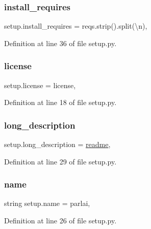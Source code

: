 \subsubsection{\texorpdfstring{install\+\_\+requires}{install\_requires}}
{\footnotesize\ttfamily setup.\+install\+\_\+requires = reqs.\+strip().split(\textquotesingle{}\textbackslash{}n\textquotesingle{}),}



Definition at line 36 of file setup.\+py.

\mbox{\label{namespacesetup_a8ed6f50a28bd6a8794f8e1153baa6de9}} 
\subsubsection{\texorpdfstring{license}{license}}
{\footnotesize\ttfamily setup.\+license = license,}



Definition at line 18 of file setup.\+py.

\mbox{\label{namespacesetup_a4cda9dbfb952875376a0749fe08a5bde}} 
\subsubsection{\texorpdfstring{long\+\_\+description}{long\_description}}
{\footnotesize\ttfamily setup.\+long\+\_\+description = \hyperlink{namespacesetup_af307481f158da7b58a33229df5e30c6c}{readme},}



Definition at line 29 of file setup.\+py.

\mbox{\label{namespacesetup_a61de3710bf6c9d78c0afa352263f8b09}} 
\subsubsection{\texorpdfstring{name}{name}}
{\footnotesize\ttfamily string setup.\+name = \textquotesingle{}parlai\textquotesingle{},}



Definition at line 26 of file setup.\+py.

